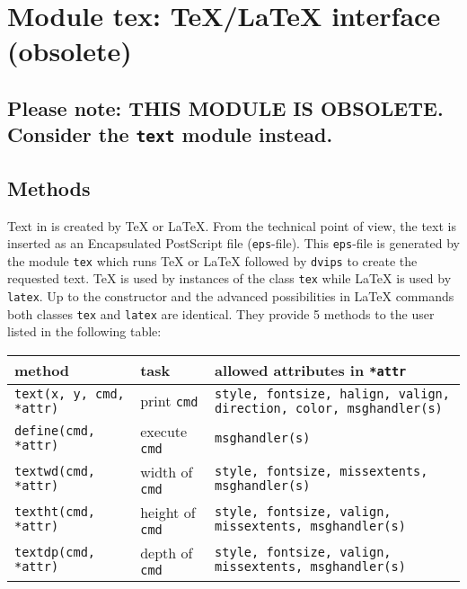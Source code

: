 \chapter{Module tex: \TeX/\LaTeX{} interface (obsolete)}
\label{tex}
\section*{Please note: THIS MODULE IS OBSOLETE. Consider the \texttt{text} module instead.}

\section{Methods}
Text in \PyX{} is created by \TeX{} or \LaTeX. From the technical point
of view, the text is inserted as an Encapsulated PostScript file
(\verb|eps|-file). This \verb|eps|-file is generated by the module
\verb|tex| which runs \TeX{} or \LaTeX{} followed by \verb|dvips| to
create the requested text. \TeX{} is used by instances of the class
\verb|tex| while \LaTeX{} is used by \verb|latex|. Up to the
constructor and the advanced possibilities in \LaTeX{} commands both
classes \verb|tex| and \verb|latex| are identical. They provide 5
methods to the user listed in the following table:

\smallskip
\begin{tabularx}{\linewidth}{ll>{\raggedright\arraybackslash}X}
method&task&allowed attributes in \texttt{*attr}\\
\hline
\texttt{text(x, y, cmd, *attr)}&print \texttt{cmd}&\texttt{style, fontsize, halign, valign, direction, color, msghandler(s)}\\
\texttt{define(cmd, *attr)}&execute \texttt{cmd}&\texttt{msghandler(s)}\\
\texttt{textwd(cmd, *attr)}&width of \texttt{cmd}&\texttt{style, fontsize, missextents, msghandler(s)}\\
\texttt{textht(cmd, *attr)}&height of \texttt{cmd}&\texttt{style, fontsize, valign, missextents, msghandler(s)}\\
\texttt{textdp(cmd, *attr)}&depth of \texttt{cmd}&\texttt{style, fontsize, valign, missextents, msghandler(s)}\\
\end{tabularx}
\smallskip

